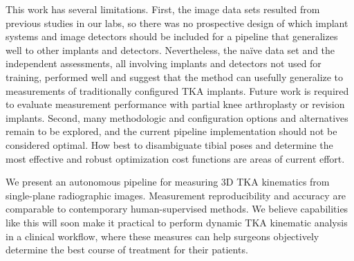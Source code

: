 This work has several limitations. First, the image data sets resulted from previous studies in our labs, so there was no prospective design of which implant systems and image detectors should be included for a pipeline that generalizes well to other implants and detectors. Nevertheless, the naïve data set and the independent assessments, all involving implants and detectors not used for training, performed well and suggest that the method can usefully generalize to measurements of traditionally configured TKA implants. Future work is required to evaluate measurement performance with partial knee arthroplasty or revision implants. Second, many methodologic and configuration options and alternatives remain to be explored, and the current pipeline implementation should not be considered optimal. How best to disambiguate tibial poses and determine the most effective and robust optimization cost functions are areas of current effort.

We present an autonomous pipeline for measuring 3D TKA kinematics from single-plane radiographic images. Measurement reproducibility and accuracy are comparable to contemporary human-supervised methods. We believe capabilities like this will soon make it practical to perform dynamic TKA kinematic analysis in a clinical workflow, where these measures can help surgeons objectively determine the best course of treatment for their patients.
